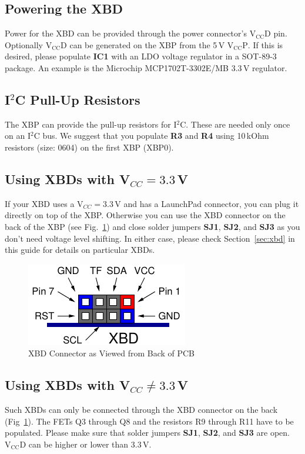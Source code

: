 \documentclass{article}
\begin{document}
\subsection{Powering the XBD}\label{sec:vccd}
Power for the XBD can be provided through the power connector's $\mathrm{V_{CC}D}$ pin.
Optionally $\mathrm{V_{CC}D}$ can be generated on the XBP from the 5\,V $\mathrm{V_{CC}P}$.
If this is desired, please populate \textbf{IC1} with an LDO voltage regulator in a 
SOT-89-3 package. An example is the Microchip MCP1702T-3302E/MB 3.3\,V regulator.


\subsection{I$^2$C Pull-Up Resistors}
The XBP can provide the pull-up resistors for I$^2$C. These are needed only once on an 
I$^2$C bus. We suggest that you populate \textbf{R3} and \textbf{R4} using 
10\,kOhm resistors (size: 0604) on the first XBP (XBP0).

\subsection{Using XBDs with V$_{CC} = 3.3$\,V}
If your XBD uses a V$_{CC} = 3.3$\,V and has a LaunchPad connector, you can plug it 
directly on top of the XBP. 
Otherwise you can use the XBD connector on the back of the XBP (see Fig.~\ref{fig:xbd})
and close solder jumpers \textbf{SJ1}, \textbf{SJ2}, and \textbf{SJ3} as you
don't need voltage level shifting.
In either case, please check Section~\ref{sec:xbd} in this guide for details
on particular XBDs. 

\begin{figure}[ht]
  \begin{center}
    \includegraphics[scale=1]{figures/xbd_connector}
    \caption{XBD Connector as Viewed from Back of PCB}\label{fig:xbd}
  \end{center}
\end{figure}

\subsection{Using XBDs with V$_{CC} \not= 3.3$\,V}
Such XBDs can only be connected through the XBD connector on the back (Fig~\ref{fig:xbd}).
The FETs Q3 through Q8 and the resistors R9  through R11 have to be populated.
Please make sure that solder jumpers \textbf{SJ1}, \textbf{SJ2}, and \textbf{SJ3} 
are open. $\mathrm{V_{CC}D}$ can be higher or lower than 3.3\,V.
\end{document}
